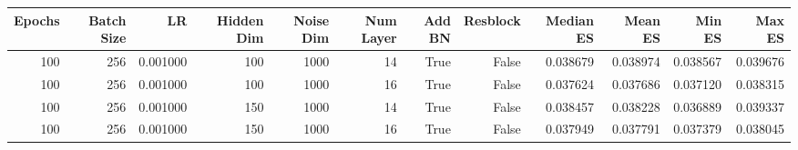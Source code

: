 \begin{tabular}{rrrrrrrrrrrr}
\toprule
Epochs & Batch Size & LR & Hidden Dim & Noise Dim & Num Layer & Add BN & Resblock & Median ES & Mean ES & Min ES & Max ES \\
\midrule
100 & 256 & 0.001000 & 100 & 1000 & 14 & True & False & 0.038679 & 0.038974 & 0.038567 & 0.039676 \\
100 & 256 & 0.001000 & 100 & 1000 & 16 & True & False & 0.037624 & 0.037686 & 0.037120 & 0.038315 \\
100 & 256 & 0.001000 & 150 & 1000 & 14 & True & False & 0.038457 & 0.038228 & 0.036889 & 0.039337 \\
100 & 256 & 0.001000 & 150 & 1000 & 16 & True & False & 0.037949 & 0.037791 & 0.037379 & 0.038045 \\
\bottomrule
\end{tabular}

